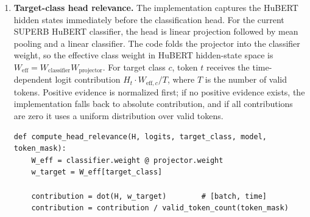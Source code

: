 \documentclass[11pt]{article}
\begin{document}
\begin{enumerate}
\begin{verbatim}
def compute_rollout_attention(layer_attentions):
    eye = identity(num_tokens)
    augmented = []

    for A in layer_attentions:
        A_residual = A + eye
        A_residual = A_residual / row_sum(A_residual)
        augmented.append(A_residual)

    R = augmented[0]
    for A in augmented[1:]:
        R = batch_matmul(A, R)

    return R
\end{verbatim}

  The pure rollout score is obtained by averaging over the final-token rows of
  the rollout matrix. Because HuBERT sequence classifiers do not use a ViT-like
  class token, the mean strategy treats all final tokens as possible evidence
  carriers. The averaged score is min-max scaled by
  \texttt{rollout\_to\_temporal\_relevance} and then normalized so each
  utterance has a valid distribution over time tokens.

\begin{verbatim}
raw_rollout = mean(R, axis=final_token_rows)
raw_rollout = min_max_scale(raw_rollout)
rollout_score = normalize_nonnegative(raw_rollout)
\end{verbatim}

  \item \textbf{Target-class head relevance.} The implementation captures the
  HuBERT hidden states immediately before the classification head. For the
  current SUPERB HuBERT classifier, the head is linear projection followed by
  mean pooling and a linear classifier. The code folds the projector into the
  classifier weight, so the effective class weight in HuBERT hidden-state space
  is $W_{\mathrm{eff}} = W_{\mathrm{classifier}} W_{\mathrm{projector}}$. For
  target class $c$, token $t$ receives the time-dependent logit contribution
  $H_t \cdot W_{\mathrm{eff},c} / T$, where $T$ is the number of valid tokens.
  Positive evidence is normalized first; if no positive evidence exists, the
  implementation falls back to absolute contribution, and if all contributions
  are zero it uses a uniform distribution over valid tokens.

\begin{verbatim}
def compute_head_relevance(H, logits, target_class, model, token_mask):
    W_eff = classifier.weight @ projector.weight
    w_target = W_eff[target_class]

    contribution = dot(H, w_target)        # [batch, time]
    contribution = contribution / valid_token_count(token_mask)


\end{verbatim}
\end{enumerate}
\end{document}
